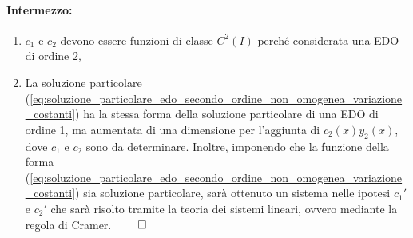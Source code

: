 \paragraph{Intermezzo:}
\begin{enumerate}
	\item $c_1$ e $c_2$ devono essere funzioni di classe $C^2(I)$ perché considerata una EDO di ordine 2,
	\item La soluzione particolare (\ref{eq:soluzione_particolare_edo_secondo_ordine_non_omogenea_variazione_costanti}) ha la stessa forma della soluzione particolare di una EDO di ordine 1, ma aumentata di una dimensione per l'aggiunta di $c_2(x) y_2(x)$, dove $c_1$ e $c_2$ sono da determinare. Inoltre, imponendo che la funzione della forma (\ref{eq:soluzione_particolare_edo_secondo_ordine_non_omogenea_variazione_costanti}) sia soluzione particolare, sarà ottenuto un sistema nelle ipotesi $c_1'$ e $c_2'$ che sarà risolto tramite la teoria dei sistemi lineari, ovvero mediante la regola di Cramer. $\qed$
\end{enumerate}

